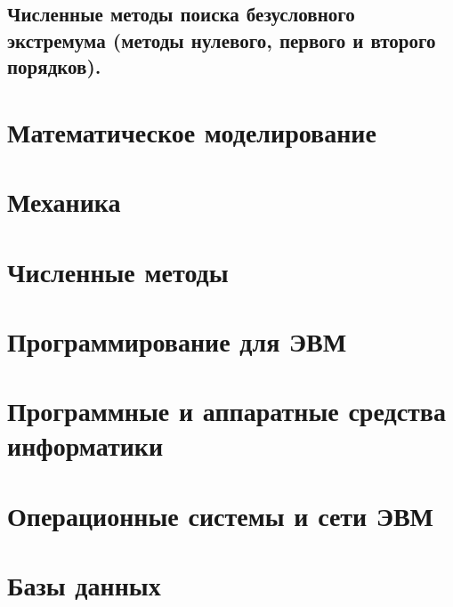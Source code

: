\documentclass[12pt]{report}
\theoremstyle{definition}
\begin{document}

\section
{
  Численные методы поиска безусловного экстремума
  (методы нулевого, первого и второго порядков).
}


\chapter{Математическое моделирование}

\chapter{Механика}

\chapter{Численные методы}

\chapter{Программирование для ЭВМ}

\chapter{Программные и аппаратные средства информатики}

\chapter{Операционные системы и сети ЭВМ}

\chapter{Базы данных}
\end{document}
